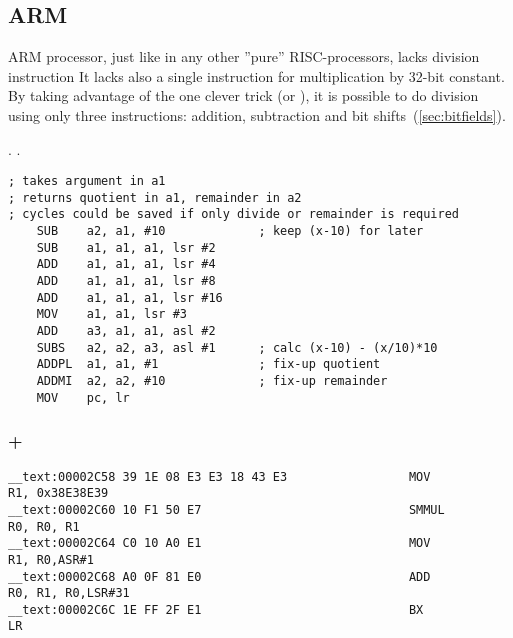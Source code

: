 

\subsection{ARM}

{ARM processor, just like in any other ''pure'' RISC-processors, lacks division instruction
It lacks also a single instruction for multiplication by 32-bit constant.}
{By taking advantage of the one clever trick (or ), it is possible to do division using only three instructions: addition,
subtraction and bit shifts}~(\ref{sec:bitfields}).

\cite[3.3 Division by a Constant]{ARM:1994}.
.

\begin{lstlisting}
; takes argument in a1
; returns quotient in a1, remainder in a2
; cycles could be saved if only divide or remainder is required
    SUB    a2, a1, #10             ; keep (x-10) for later
    SUB    a1, a1, a1, lsr #2
    ADD    a1, a1, a1, lsr #4
    ADD    a1, a1, a1, lsr #8
    ADD    a1, a1, a1, lsr #16
    MOV    a1, a1, lsr #3
    ADD    a3, a1, a1, asl #2
    SUBS   a2, a2, a3, asl #1      ; calc (x-10) - (x/10)*10
    ADDPL  a1, a1, #1              ; fix-up quotient
    ADDMI  a2, a2, #10             ; fix-up remainder
    MOV    pc, lr
\end{lstlisting}

\subsubsection{\OptimizingXcode + \ARMMode}

\begin{lstlisting}
__text:00002C58 39 1E 08 E3 E3 18 43 E3                 MOV             R1, 0x38E38E39
__text:00002C60 10 F1 50 E7                             SMMUL           R0, R0, R1
__text:00002C64 C0 10 A0 E1                             MOV             R1, R0,ASR#1
__text:00002C68 A0 0F 81 E0                             ADD             R0, R1, R0,LSR#31
__text:00002C6C 1E FF 2F E1                             BX              LR
\end{lstlisting}

